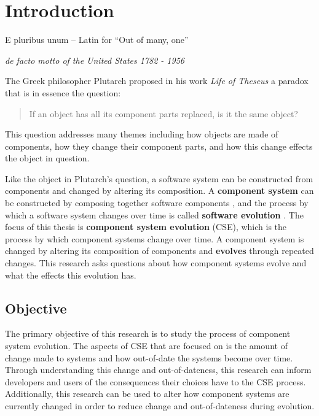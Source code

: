 \chapter{Introduction}
\label{introduction}
\epigraph{E pluribus unum -- Latin for ``Out of many, one''}
{\textit{de facto motto of the United States 1782 - 1956}}
The Greek philosopher Plutarch proposed in his work \textit{Life of Theseus} a paradox that is in essence the question:
\begin{quote}
If an object has all its component parts replaced, is it the same object?
\end{quote}
This question addresses many themes including how objects are made of components, how they change their component parts,
and how this change effects the object in question.

Like the object in Plutarch's question, a software system can be constructed from components and changed by altering its composition.
A \textbf{component system} can be constructed by composing together software components \citep{Szyperski2002},
and the process by which a software system changes over time is called \textbf{software evolution} \citep{lehman1980}.
The focus of this thesis is \textbf{component system evolution} (CSE), which is the process by which component systems change over time.
A component system is changed by altering its composition of components and \textbf{evolves} through repeated changes.
This research asks questions about how component systems evolve and what the effects this evolution has.

\section{Objective}
The primary objective of this research is to study the process of component system evolution. 
The aspects of CSE that are focused on is the amount of change made to systems and how out-of-date the systems become over time.
Through understanding this change and out-of-dateness,
this research can inform developers and users of the consequences their choices have to the CSE process.
Additionally, this research can be used to alter how component systems are currently changed in order to reduce change and out-of-dateness during evolution.

